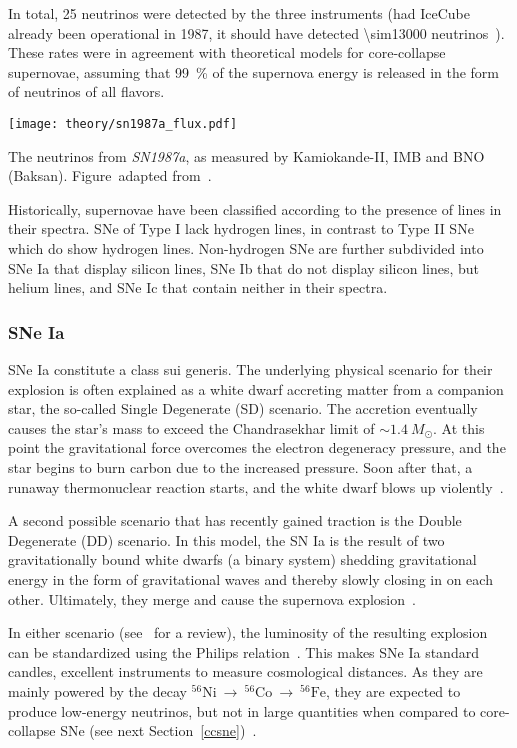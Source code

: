 In total, 25 neutrinos were detected by the three instruments (had IceCube already been operational in 1987, it should have detected \num{\sim13000} neutrinos~). These rates were in agreement with theoretical models for core-collapse supernovae, assuming that \SI{99}{\percent} of the supernova energy is released in the form of neutrinos of all flavors.

\begin{marginfigure}
    \texttt{[image: theory/sn1987a\_flux.pdf]}
    \caption[Neutrinos from \emph{SN1987a}]{The neutrinos from \emph{SN1987a}, as measured by Kamiokande-II, IMB and BNO (Baksan). Figure\ adapted from~\cite{Grupen2005}.}
\end{marginfigure}

Historically, supernovae have been classified according to the presence of lines in their spectra. SNe of Type I lack hydrogen lines, in contrast to Type II SNe which do show hydrogen lines. Non-hydrogen SNe are further subdivided into SNe Ia that display silicon lines, SNe Ib that do not display silicon lines, but helium lines, and SNe Ic that contain neither in their spectra.

\subsubsection{SNe Ia}\label{sne_ia}
SNe Ia constitute a class sui generis. The underlying physical scenario for their explosion is often explained as a white dwarf accreting matter from a companion star, the so-called Single Degenerate (SD) scenario. The accretion eventually causes the star's mass to exceed the Chandrasekhar limit of $\sim1.4~M_\odot$. At this point the gravitational force overcomes the electron degeneracy pressure, and the star begins to burn carbon due to the increased pressure. Soon after that, a runaway thermonuclear reaction starts, and the white dwarf blows up violently~.

A second possible scenario that has recently gained traction is the Double Degenerate (DD) scenario. In this model, the SN Ia is the result of two gravitationally bound white dwarfs (a binary system) shedding gravitational energy in the form of gravitational waves and thereby slowly closing in on each other. Ultimately, they merge and cause the supernova explosion~\cite{Iben1984}.

In either scenario (see~ for a review), the luminosity of the resulting explosion can be standardized using the Philips relation~. This makes SNe Ia standard candles, excellent instruments to measure cosmological distances. As they are mainly powered by the decay $^{56}\text{Ni}~\rightarrow~^{56}\text{Co}~\rightarrow~^{56}\text{Fe}$, they are expected to produce low-energy neutrinos, but not in large quantities when compared to core-collapse SNe (see next Section~\ref{ccsne})~.


